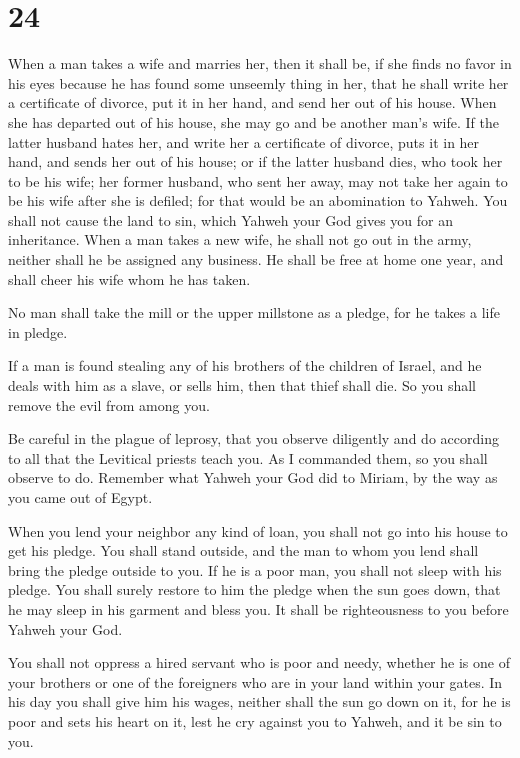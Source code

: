 \hypertarget{section-23}{%
\section{24}\label{section-23}}

 When a man takes a wife and marries her, then it shall be,
if she finds no favor in his eyes because he has found some unseemly
thing in her, that he shall write her a certificate of divorce, put it
in her hand, and send her out of his house.  When she has
departed out of his house, she may go and be another man's wife.
 If the latter husband hates her, and write her a
certificate of divorce, puts it in her hand, and sends her out of his
house; or if the latter husband dies, who took her to be his wife;
 her former husband, who sent her away, may not take her
again to be his wife after she is defiled; for that would be an
abomination to Yahweh. You shall not cause the land to sin, which Yahweh
your God gives you for an inheritance.  When a man takes a
new wife, he shall not go out in the army, neither shall he be assigned
any business. He shall be free at home one year, and shall cheer his
wife whom he has taken.

 No man shall take the mill or the upper millstone as a
pledge, for he takes a life in pledge.

 If a man is found stealing any of his brothers of the
children of Israel, and he deals with him as a slave, or sells him, then
that thief shall die. So you shall remove the evil from among you.

 Be careful in the plague of leprosy, that you observe
diligently and do according to all that the Levitical priests teach you.
As I commanded them, so you shall observe to do.  Remember
what Yahweh your God did to Miriam, by the way as you came out of Egypt.

 When you lend your neighbor any kind of loan, you shall
not go into his house to get his pledge.  You shall stand
outside, and the man to whom you lend shall bring the pledge outside to
you.  If he is a poor man, you shall not sleep with his
pledge.  You shall surely restore to him the pledge when
the sun goes down, that he may sleep in his garment and bless you. It
shall be righteousness to you before Yahweh your God.

 You shall not oppress a hired servant who is poor and
needy, whether he is one of your brothers or one of the foreigners who
are in your land within your gates.  In his day you shall
give him his wages, neither shall the sun go down on it, for he is poor
and sets his heart on it, lest he cry against you to Yahweh, and it be
sin to you.

